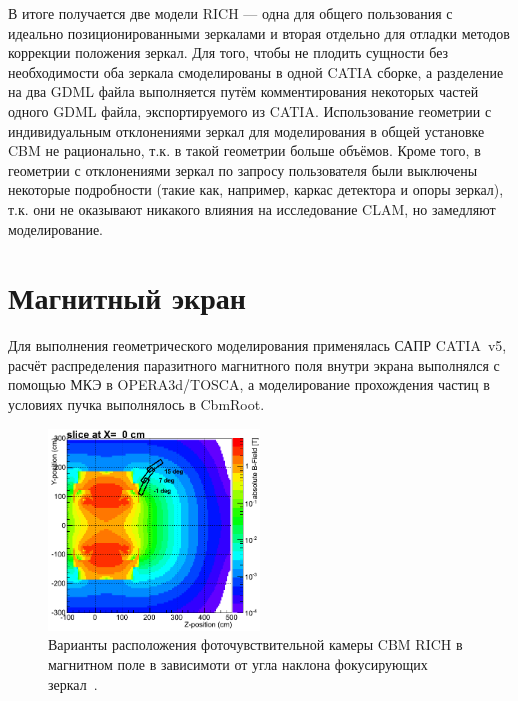 В итоге получается две модели RICH --- одна для общего пользования с идеально позиционированными зеркалами и вторая отдельно для отладки методов коррекции положения зеркал. Для того, чтобы не \todo плодить сущности без необходимости оба зеркала смоделированы в одной CATIA сборке, а разделение на два GDML файла выполняется путём комментирования некоторых частей одного GDML файла, экспортируемого из CATIA. Использование геометрии с индивидуальным отклонениями зеркал для моделирования в общей установке CBM не рационально, т.к. в такой геометрии больше объёмов. Кроме того, в геометрии с отклонениями зеркал по запросу пользователя были выключены некоторые подробности (такие как, например, каркас детектора и опоры зеркал), т.к. они не оказывают никакого влияния на исследование CLAM, но замедляют моделирование.


\section{Магнитный экран}\label{sec:secRICHmagScreen}

Для выполнения геометрического моделирования применялась САПР CATIA~v5, расчёт распределения паразитного магнитного поля внутри экрана выполнялся с помощью МКЭ в OPERA3d/TOSCA, а моделирование прохождения частиц в условиях пучка выполнялось в CbmRoot.


\begin{figure}[H]
\centering
\includegraphics[width=0.5\textwidth]{pictures/MagScreenPositions.png}
\caption{Варианты расположения фоточувствительной камеры CBM RICH в магнитном поле в зависимоти от угла наклона фокусирующих зеркал~\cite{RichCameraInField}.}
\label{fig:MagScreenPositions}
\end{figure}

